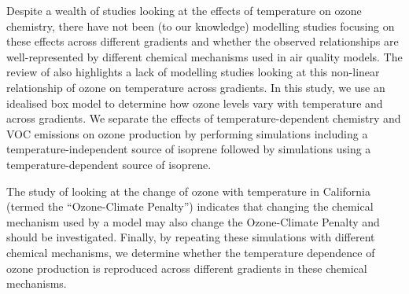 Despite a wealth of studies looking at the effects of temperature on ozone chemistry, there have not been (to our knowledge) modelling studies focusing on these effects across different  gradients and whether the observed relationships are well-represented by different chemical mechanisms used in air quality models.
The review of \citet{Pusede:2015} also highlights a lack of modelling studies looking at this non-linear relationship of ozone on temperature across  gradients.
In this study, we use an idealised box model to determine how ozone levels vary with temperature and across  gradients.
We separate the effects of temperature-dependent chemistry and VOC emissions on ozone production by performing simulations including a temperature-independent source of isoprene followed by simulations using a temperature-dependent source of isoprene. 

The study of \citet{Rasmussen:2013} looking at the change of ozone with temperature in California (termed the ``Ozone-Climate Penalty'') indicates that changing the chemical mechanism used by a model may also change the Ozone-Climate Penalty and should be investigated.
Finally, by repeating these simulations with different chemical mechanisms, we determine whether the temperature dependence of ozone production is reproduced across different  gradients in these chemical mechanisms.
